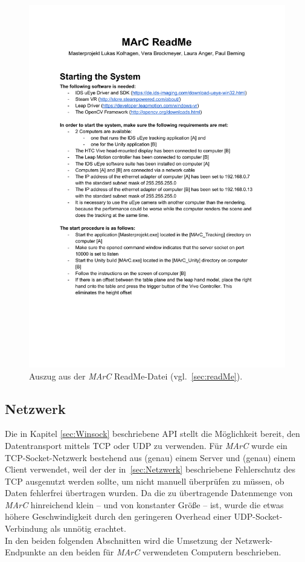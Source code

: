 \begin{figure}
	\centering
	\includegraphics[page=1, trim=1cm 12.25cm 1cm 5.25cm, clip, width=\textwidth]{kapitel/anhang/ReadMe.pdf} 
	\caption{Auszug aus der \emph{MArC} ReadMe-Datei (vgl.~\ref{sec:readMe}).}
	\label{fig:marcReadMe}
\end{figure}

\subsection{Netzwerk}\label{sec:netzwerk}

Die in Kapitel \ref{sec:Winsock} beschriebene API stellt die Möglichkeit bereit, den Datentransport mittels TCP oder UDP zu verwenden. Für \emph{MArC} wurde ein TCP-Socket-Netzwerk bestehend aus (genau) einem Server und (genau) einem Client verwendet, weil der der in~\ref{sec:Netzwerk} beschriebene Fehlerschutz des TCP ausgenutzt werden sollte, um nicht manuell überprüfen zu müssen, ob Daten fehlerfrei übertragen wurden. Da die zu übertragende Datenmenge von \emph{MArC} hinreichend klein -- und von konstanter Größe -- ist, wurde die etwas höhere Geschwindigkeit durch den geringeren Overhead einer UDP-Socket-Verbindung als unnötig erachtet.\\
In den beiden folgenden Abschnitten wird die Umsetzung der Netzwerk-Endpunkte an den beiden für \emph{MArC} verwendeten Computern beschrieben.

